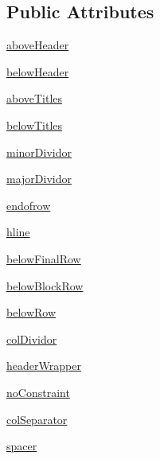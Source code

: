 \subsection*{Public Attributes}
\begin{DoxyCompactItemize}
\item 
\mbox{\hyperlink{classplanckStyle_1_1planckStyleTableFormatter_ac28e85af312a313721d1fb1fa04a3b2f}{above\+Header}}
\item 
\mbox{\hyperlink{classplanckStyle_1_1planckStyleTableFormatter_ab6890a1cbeb953eb35a1786e62aeb227}{below\+Header}}
\item 
\mbox{\hyperlink{classplanckStyle_1_1planckStyleTableFormatter_a84a326efe3944f1a24b41f1220d2f538}{above\+Titles}}
\item 
\mbox{\hyperlink{classplanckStyle_1_1planckStyleTableFormatter_a5f8386b71d78370b9ce7307ac6f2a68c}{below\+Titles}}
\item 
\mbox{\hyperlink{classplanckStyle_1_1planckStyleTableFormatter_a91c2c547aea53cccef18abe79fee953b}{minor\+Dividor}}
\item 
\mbox{\hyperlink{classplanckStyle_1_1planckStyleTableFormatter_a7c09bad56d531e92b160f4e355ce9606}{major\+Dividor}}
\item 
\mbox{\hyperlink{classplanckStyle_1_1planckStyleTableFormatter_a1c1e214ea325c050afad5d7630301f2b}{endofrow}}
\item 
\mbox{\hyperlink{classplanckStyle_1_1planckStyleTableFormatter_a53a545b333f573df2c619a1f675c6fca}{hline}}
\item 
\mbox{\hyperlink{classplanckStyle_1_1planckStyleTableFormatter_a331f4da4dab2fd4eb0955fb6e842b7eb}{below\+Final\+Row}}
\item 
\mbox{\hyperlink{classplanckStyle_1_1planckStyleTableFormatter_a2faa3f31173af363e320cd24ac84cfa6}{below\+Block\+Row}}
\item 
\mbox{\hyperlink{classplanckStyle_1_1planckStyleTableFormatter_af16c1aca7773b28148af07a59033f2b4}{below\+Row}}
\item 
\mbox{\hyperlink{classplanckStyle_1_1planckStyleTableFormatter_affceb5203a8c5cf66e49f6d6dc86eca5}{col\+Dividor}}
\item 
\mbox{\hyperlink{classplanckStyle_1_1planckStyleTableFormatter_a59a50aa7d7549c4b7f121257b41e91ad}{header\+Wrapper}}
\item 
\mbox{\hyperlink{classplanckStyle_1_1planckStyleTableFormatter_a8afdb76329f5b462450989b845dfcbc0}{no\+Constraint}}
\item 
\mbox{\hyperlink{classplanckStyle_1_1planckStyleTableFormatter_a3ddd75e3d2ac6b5669483c8173c472e0}{col\+Separator}}
\item 
\mbox{\hyperlink{classplanckStyle_1_1planckStyleTableFormatter_a046312d89f91421f28a19bcea00d173b}{spacer}}
\end{DoxyCompactItemize}
